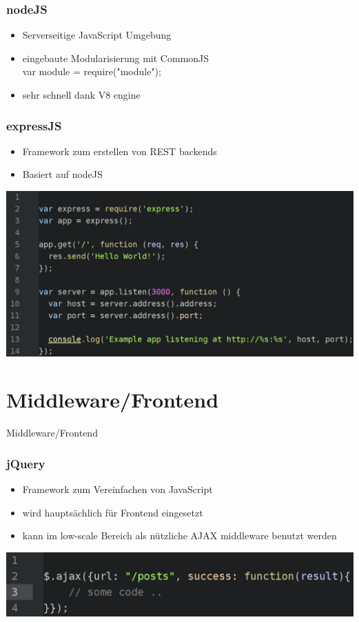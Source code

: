 \documentclass{beamer}
\begin{document}

\begin{frame}
\frametitle{nodeJS}
\begin{itemize}
\item Serverseitige JavaScript Umgebung
\item eingebaute Modularisierung mit CommonJS\\var module = require("module");
\item sehr schnell dank V8 engine
\end{itemize}
\end{frame}


\begin{frame}
\frametitle{expressJS}
\begin{itemize}
\item Framework zum erstellen von REST backends
\item Basiert auf nodeJS
\end{itemize}
\includegraphics[scale=0.23]{assets/express_example.png}
\end{frame}


\section{Middleware/Frontend}

\begin{frame}
\Huge{
\centerline{Middleware/Frontend}
}
\end{frame}


\begin{frame}
\frametitle{jQuery}
\begin{itemize}
\item Framework zum Vereinfachen von JavaScript
\item wird hauptsächlich für Frontend eingesetzt
\item kann im low-scale Bereich als nützliche AJAX middleware benutzt werden
\end{itemize}
\includegraphics[scale=0.3]{assets/jQuery.png}
\end{frame}
\end{document}

